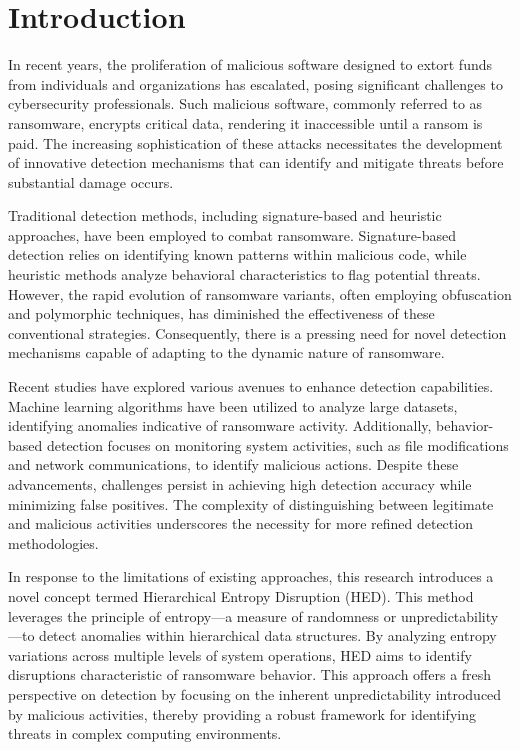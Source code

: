 \documentclass[lettersize,journal]{IEEEtran}
\begin{document}
\section{Introduction}

In recent years, the proliferation of malicious software designed to extort funds from individuals and organizations has escalated, posing significant challenges to cybersecurity professionals. Such malicious software, commonly referred to as ransomware, encrypts critical data, rendering it inaccessible until a ransom is paid. The increasing sophistication of these attacks necessitates the development of innovative detection mechanisms that can identify and mitigate threats before substantial damage occurs.

Traditional detection methods, including signature-based and heuristic approaches, have been employed to combat ransomware. Signature-based detection relies on identifying known patterns within malicious code, while heuristic methods analyze behavioral characteristics to flag potential threats. However, the rapid evolution of ransomware variants, often employing obfuscation and polymorphic techniques, has diminished the effectiveness of these conventional strategies. Consequently, there is a pressing need for novel detection mechanisms capable of adapting to the dynamic nature of ransomware.

Recent studies have explored various avenues to enhance detection capabilities. Machine learning algorithms have been utilized to analyze large datasets, identifying anomalies indicative of ransomware activity. Additionally, behavior-based detection focuses on monitoring system activities, such as file modifications and network communications, to identify malicious actions. Despite these advancements, challenges persist in achieving high detection accuracy while minimizing false positives. The complexity of distinguishing between legitimate and malicious activities underscores the necessity for more refined detection methodologies.

In response to the limitations of existing approaches, this research introduces a novel concept termed Hierarchical Entropy Disruption (HED). This method leverages the principle of entropy—a measure of randomness or unpredictability—to detect anomalies within hierarchical data structures. By analyzing entropy variations across multiple levels of system operations, HED aims to identify disruptions characteristic of ransomware behavior. This approach offers a fresh perspective on detection by focusing on the inherent unpredictability introduced by malicious activities, thereby providing a robust framework for identifying threats in complex computing environments.
\end{document}
